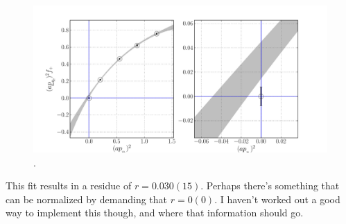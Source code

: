 \begin{figure}[htb!]
\centering
\includegraphics[scale=0.45]{images/NRQCD/p2fp_Bcetac_ward.pdf}
\caption{\label{fig:p2fp}.}
\end{figure}
This fit results in a residue of $r = 0.030(15)$. Perhaps there's something that can be normalized by demanding that $r=0(0)$. I haven't worked out a good way to implement this though, and where that information should go.

